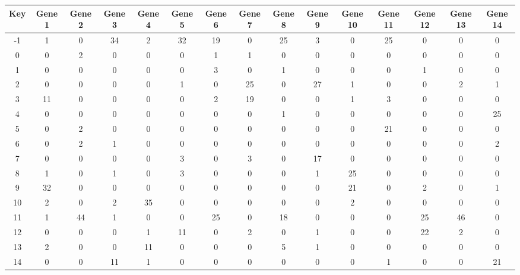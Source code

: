 \begin{tabular}{|c|c|c|c|c|c|c|c|c|c|c|c|c|c|c|}
\hline
Key & Gene 1 & Gene 2 & Gene 3 & Gene 4 & Gene 5 & Gene 6 & Gene 7 & Gene 8 & Gene 9 & Gene 10 & Gene 11 & Gene 12 & Gene 13 & Gene 14 \\
\hline
-1 & 1 & 0 & 34 & 2 & 32 & 19 & 0 & 25 & 3 & 0 & 25 & 0 & 0 & 0 \\
0 & 0 & 2 & 0 & 0 & 0 & 1 & 1 & 0 & 0 & 0 & 0 & 0 & 0 & 0 \\
1 & 0 & 0 & 0 & 0 & 0 & 3 & 0 & 1 & 0 & 0 & 0 & 1 & 0 & 0 \\
2 & 0 & 0 & 0 & 0 & 1 & 0 & 25 & 0 & 27 & 1 & 0 & 0 & 2 & 1 \\
3 & 11 & 0 & 0 & 0 & 0 & 2 & 19 & 0 & 0 & 1 & 3 & 0 & 0 & 0 \\
4 & 0 & 0 & 0 & 0 & 0 & 0 & 0 & 1 & 0 & 0 & 0 & 0 & 0 & 25 \\
5 & 0 & 2 & 0 & 0 & 0 & 0 & 0 & 0 & 0 & 0 & 21 & 0 & 0 & 0 \\
6 & 0 & 2 & 1 & 0 & 0 & 0 & 0 & 0 & 0 & 0 & 0 & 0 & 0 & 2 \\
7 & 0 & 0 & 0 & 0 & 3 & 0 & 3 & 0 & 17 & 0 & 0 & 0 & 0 & 0 \\
8 & 1 & 0 & 1 & 0 & 3 & 0 & 0 & 0 & 1 & 25 & 0 & 0 & 0 & 0 \\
9 & 32 & 0 & 0 & 0 & 0 & 0 & 0 & 0 & 0 & 21 & 0 & 2 & 0 & 1 \\
10 & 2 & 0 & 2 & 35 & 0 & 0 & 0 & 0 & 0 & 2 & 0 & 0 & 0 & 0 \\
11 & 1 & 44 & 1 & 0 & 0 & 25 & 0 & 18 & 0 & 0 & 0 & 25 & 46 & 0 \\
12 & 0 & 0 & 0 & 1 & 11 & 0 & 2 & 0 & 1 & 0 & 0 & 22 & 2 & 0 \\
13 & 2 & 0 & 0 & 11 & 0 & 0 & 0 & 5 & 1 & 0 & 0 & 0 & 0 & 0 \\
14 & 0 & 0 & 11 & 1 & 0 & 0 & 0 & 0 & 0 & 0 & 1 & 0 & 0 & 21 \\
\hline
\end{tabular}
